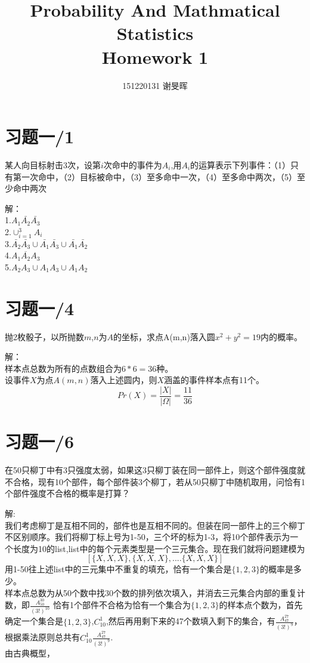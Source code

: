 \documentclass[a4paper]{ctexart}
\title{Probability And Mathmatical Statistics\\Homework 1}
\author{151220131 谢旻晖}
\date{}
\begin{document}
\maketitle
\section{习题一/1}
某人向目标射击3次，设第$i$次命中的事件为$A_i$,用$A_i$的运算表示下列事件：（1）只有第一次命中，（2）目标被命中，（3）至多命中一次，（4）至多命中两次，（5）至少命中两次

\noindent 解：\\
1.$A_{1}\bar{A_{2}}\bar{A_{3}}$\\
2.$\cup_{i=1}^{3}A_{i}$\\
3.$\bar{A_{2}}\bar{A_{3}}\cup\bar{A_{1}}\bar{A_{3}}\cup\bar{A_{1}}\bar{A_{2}}$\\
4.$\overline{A_{1}A_{2}A_{3}}$\\
5.$A_{2}A_{3}\cup A_{1}A_{3}\cup A_{1}A_{2}$

\section{习题一/4}
抛2枚骰子，以所抛数$m$,$n$为$A$的坐标，求点A(m,n)落入圆$x^2+y^2=19$内的概率。


\noindent 解：\\
\indent 样本点总数为所有的点数组合为$6*6=36$种。\\
\indent 设事件$X$为点$A(m,n)$落入上述圆内，则$X$涵盖的事件样本点有11个。\\
\[
Pr(X)=\frac{|X|}{|\Omega|}=\frac{11}{36}
\]

\section{习题一/6}
在50只柳丁中有3只强度太弱，如果这3只柳丁装在同一部件上，则这个部件强度就不合格，现有10个部件，每个部件装3个柳丁，若从50只柳丁中随机取用，问恰有1个部件强度不合格的概率是打算？


\noindent 解:\\
\indent 我们考虑柳丁是互相不同的，部件也是互相不同的。但装在同一部件上的三个柳丁不区别顺序。我们将柳丁标上号为1-50，三个坏的标为1-3，将10个部件表示为一个长度为10的list,list中的每个元素类型是一个三元集合。现在我们就将问题建模为
\[[\{X,X,X\},\{X,X,X\},....\{X,X,X\}]\]
用1-50往上述list中的三元集中不重复的填充，恰有一个集合是$\{1,2,3\}$的概率是多少。\\
\indent 样本点总数为从50个数中找30个数的排列依次填入，并消去三元集合内部的重复计数，即$\frac{A_{50}^{30}}{(3!)^{10}}$
\indent 恰有1个部件不合格为恰有一个集合为$\{1,2,3\}$的样本点个数为，首先确定一个集合是$\{1,2,3\}$,$C_{10}^1$,然后再用剩下来的47个数填入剩下的集合，有$\frac{A_{47}^{27}}{(3!)^9}$，根据乘法原则总共有$C_{10}^1 \frac{A_{47}^{27}}{(3!)^9}$.\\
\indent 由古典概型，
\end{document}
